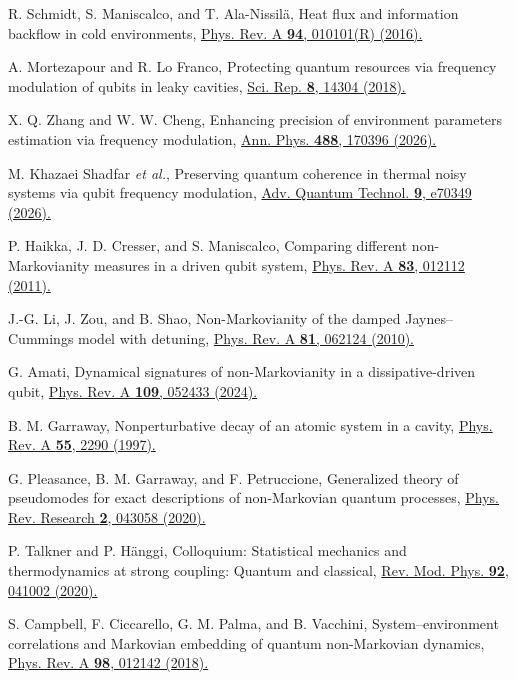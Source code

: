 \documentclass[reprint,superscriptaddress,floatfix,amsmath,amssymb,prresearch,aps]{revtex4-2}
\newcommand{\doilink}[2]{\href{https://doi.org/#1}{#2}}
\begin{document}
\begin{thebibliography}{99}
R. Schmidt, S. Maniscalco, and T. Ala-Nissil\"a,
Heat flux and information backflow in cold environments,
\doilink{10.1103/PhysRevA.94.010101}{Phys. Rev. A \textbf{94}, 010101(R) (2016).}

A. Mortezapour and R. Lo Franco,
Protecting quantum resources via frequency modulation of qubits in leaky
cavities,
\doilink{10.1038/s41598-018-32661-2}{Sci. Rep. \textbf{8}, 14304 (2018).}

X. Q. Zhang and W. W. Cheng,
Enhancing precision of environment parameters estimation via frequency
modulation,
\doilink{10.1016/j.aop.2026.170396}{Ann. Phys. \textbf{488}, 170396 (2026).}

M. Khazaei Shadfar \textit{et al.},
Preserving quantum coherence in thermal noisy systems via qubit frequency
modulation,
\doilink{10.1002/qute.70349}{Adv. Quantum Technol. \textbf{9}, e70349 (2026).}

P. Haikka, J. D. Cresser, and S. Maniscalco,
Comparing different non-Markovianity measures in a driven qubit system,
\doilink{10.1103/PhysRevA.83.012112}{Phys. Rev. A \textbf{83}, 012112 (2011).}

J.-G. Li, J. Zou, and B. Shao,
Non-Markovianity of the damped Jaynes--Cummings model with detuning,
\doilink{10.1103/PhysRevA.81.062124}{Phys. Rev. A \textbf{81}, 062124 (2010).}

G. Amati,
Dynamical signatures of non-Markovianity in a dissipative-driven qubit,
\doilink{10.1103/PhysRevA.109.052433}{Phys. Rev. A \textbf{109}, 052433 (2024).}

B. M. Garraway,
Nonperturbative decay of an atomic system in a cavity,
\doilink{10.1103/PhysRevA.55.2290}{Phys. Rev. A \textbf{55}, 2290 (1997).}

G. Pleasance, B. M. Garraway, and F. Petruccione,
Generalized theory of pseudomodes for exact descriptions of non-Markovian
quantum processes,
\doilink{10.1103/PhysRevResearch.2.043058}{Phys. Rev. Research \textbf{2}, 043058 (2020).}

P. Talkner and P. H\"anggi,
Colloquium: Statistical mechanics and thermodynamics at strong coupling:
Quantum and classical,
\doilink{10.1103/RevModPhys.92.041002}{Rev. Mod. Phys. \textbf{92}, 041002 (2020).}

S. Campbell, F. Ciccarello, G. M. Palma, and B. Vacchini,
System--environment correlations and Markovian embedding of quantum
non-Markovian dynamics,
\doilink{10.1103/PhysRevA.98.012142}{Phys. Rev. A \textbf{98}, 012142 (2018).}


\end{thebibliography}
\end{document}
